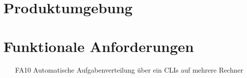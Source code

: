 \documentclass[a4paper,12pt]{article}
\begin{document}
\section{Produktumgebung}

\section{Funktionale Anforderungen}
\begin{itemize}[nosep]
\item[FA10] Automatische Aufgabenverteilung über ein \glspl{CLI} auf mehrere Rechner
\end{itemize}

















\end{document}
